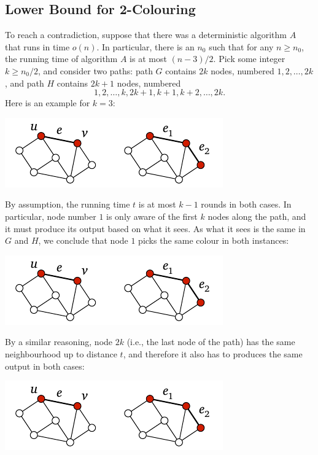 \subsection{Lower Bound for 2-Colouring}

To reach a contradiction, suppose that there was a deterministic algorithm $A$ that runs in time $o(n)$. In particular, there is an $n_0$ such that for any $n \ge n_0$, the running time of algorithm $A$ is at most $(n-3)/2$. Pick some integer $k \ge n_0/2$, and consider two paths: path $G$ contains $2k$ nodes, numbered $1,2,\dotsc,2k$, and path $H$ contains $2k+1$ nodes, numbered \[1,2,\dotsc,k,2k+1,k+1,k+2,\dotsc,2k.\] Here is an example for $k = 3$:
\begin{center}
    \includegraphics[page=\PIntroLbTwoA]{figs.pdf}
\end{center}
By assumption, the running time $t$ is at most $k-1$ rounds in both cases. In particular, node number $1$ is only aware of the first $k$ nodes along the path, and it must produce its output based on what it sees. As what it sees is the same in $G$ and $H$, we conclude that node $1$ picks the same colour in both instances:
\begin{center}
    \includegraphics[page=\PIntroLbTwoB]{figs.pdf}
\end{center}
By a similar reasoning, node $2k$ (i.e., the last node of the path) has the same neighbourhood up to distance $t$, and therefore it also has to produces the same output in both cases:
\begin{center}
    \includegraphics[page=\PIntroLbTwoC]{figs.pdf}
\end{center}
